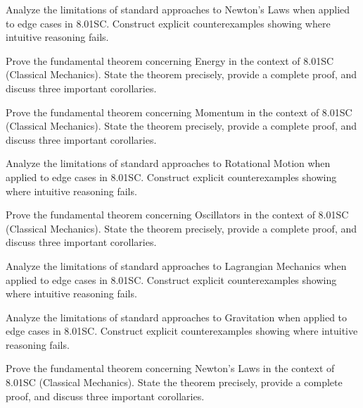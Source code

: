 \documentclass[12pt,a4paper]{exam}
\begin{document}
\begin{questions}

\question[2]
Analyze the limitations of standard approaches to Newton's Laws when applied to edge cases in 8.01SC. Construct explicit counterexamples showing where intuitive reasoning fails.

\vspace{0.3cm}

\question[2]
Prove the fundamental theorem concerning Energy in the context of 8.01SC (Classical Mechanics). State the theorem precisely, provide a complete proof, and discuss three important corollaries.

\vspace{0.3cm}

\question[4]
Prove the fundamental theorem concerning Momentum in the context of 8.01SC (Classical Mechanics). State the theorem precisely, provide a complete proof, and discuss three important corollaries.

\vspace{0.3cm}

\question[4]
Analyze the limitations of standard approaches to Rotational Motion when applied to edge cases in 8.01SC. Construct explicit counterexamples showing where intuitive reasoning fails.

\vspace{0.3cm}

\question[8]
Prove the fundamental theorem concerning Oscillators in the context of 8.01SC (Classical Mechanics). State the theorem precisely, provide a complete proof, and discuss three important corollaries.

\vspace{0.3cm}

\question[2]
Analyze the limitations of standard approaches to Lagrangian Mechanics when applied to edge cases in 8.01SC. Construct explicit counterexamples showing where intuitive reasoning fails.

\vspace{0.3cm}

\question[2]
Analyze the limitations of standard approaches to Gravitation when applied to edge cases in 8.01SC. Construct explicit counterexamples showing where intuitive reasoning fails.

\vspace{0.3cm}

\question[4]
Prove the fundamental theorem concerning Newton's Laws in the context of 8.01SC (Classical Mechanics). State the theorem precisely, provide a complete proof, and discuss three important corollaries.


\end{questions}
\end{document}
